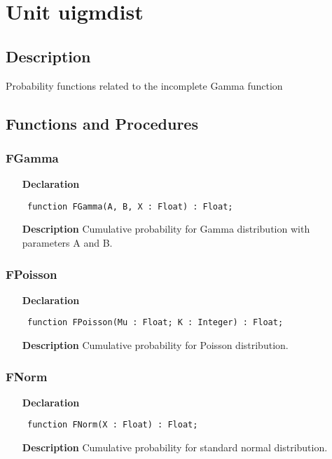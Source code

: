 \documentclass[12pt,a4paper,oneside]{report}
\newcommand{\declarationitem}[1]{\textbf{#1}}
\newcommand{\descriptiontitle}[1]{\textbf{#1}}
\newcommand{\code}[1]{\texttt{#1}}
\begin{document}
\section{Unit uigmdist}
\label{uigmdist}
\subsection{Description}
Probability functions related to the incomplete Gamma function 
\subsection{Functions and Procedures}
\subsubsection{FGamma}
\label{uigmdist-FGamma}
\begin{itemize}\item[\declarationitem{Declaration}\hfill]
	\begin{flushleft}
		\code{
			function FGamma(A, B, X : Float) : Float;}
	\end{flushleft}
	\item[\descriptiontitle{Description}]
	Cumulative probability for Gamma distribution with parameters A and B.
\end{itemize}
\subsubsection{FPoisson}
\label{uigmdist-FPoisson}
\begin{itemize}\item[\declarationitem{Declaration}\hfill]
	\begin{flushleft}
		\code{
			function FPoisson(Mu : Float; K : Integer) : Float;}
	\end{flushleft}
	\item[\descriptiontitle{Description}]
	Cumulative probability for Poisson distribution.
\end{itemize}
\subsubsection{FNorm}
\label{uigmdist-FNorm}
\begin{itemize}\item[\declarationitem{Declaration}\hfill]
	\begin{flushleft}
		\code{
			function FNorm(X : Float) : Float;}
	\end{flushleft}
	\item[\descriptiontitle{Description}]
	Cumulative probability for standard normal distribution.
\end{itemize}
\end{document}
